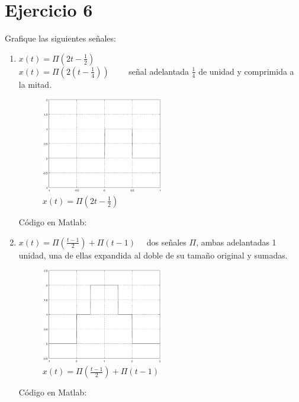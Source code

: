 \documentclass[10pt,a4paper]{report}
\begin{document}
\section{Ejercicio 6}
Grafique las siguientes señales:
\begin{enumerate}
  \item $x(t)=\Pi \left(2t-\frac{1}{2}\right)$\\
  $x(t)=\Pi \left(2\left(t-\frac{1}{4}\right)\right)\qquad$ señal adelantada $\frac{1}{4}$ de unidad y comprimida a la mitad.
  
    \begin{figure}[H]
      \begin{center}
        \includegraphics[width=0.5\textwidth]{Ejercicio6/IncisoA}
        \caption{$x(t)=\Pi \left(2t-\frac{1}{2}\right)$}
        \label{fig:Inciso A}
      \end{center}
    \end{figure}
    Código en Matlab:
    
    
  \item $x\left(t\right)=\Pi\left(\frac{t-1}{2}\right)+\Pi\left(t-1\right)\quad$ dos señales $\Pi$, ambas adelantadas 1 unidad, una de ellas expandida al doble de su tamaño original y sumadas.
    \begin{figure}[H]
      \begin{center}
        \includegraphics[width=0.5\textwidth]{Ejercicio6/IncisoB}
        \caption{$x\left(t\right)=\Pi\left(\frac{t-1}{2}\right)+\Pi\left(t-1\right)$}
        \label{fig:Inciso B}
      \end{center}
    \end{figure}
    Código en Matlab:
    
    
\end{enumerate}
\end{document}
